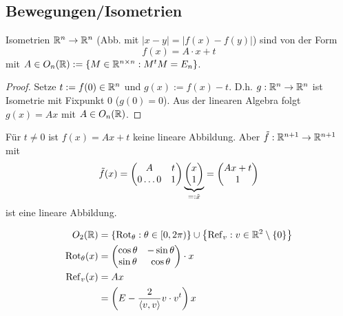 \begin{center}
	
\end{center}


\subsection*{Bewegungen/Isometrien} %
\label{sub:Bewegungen/Isometrien}

\begin{thm}
	Isometrien $\mathbb R^n \to \mathbb R^n$ (Abb. mit $|x-y| = |f(x)-f(y)|$) sind von der Form
	$$
		f(x) = A \cdot x + t
	$$
	mit $A \in O_n(\mathbb R) := \left\{ M \in \mathbb R^{n \times n} : M^t M = E_n \right\}$.
	\begin{proof}
		Setze $t := f(0) \in \mathbb R^n$ und $g(x) := f(x) - t$. D.h. $g: \mathbb R^n \to \mathbb R^n$ ist Isometrie mit
		Fixpunkt $0$ ($g(0) = 0$). Aus der linearen Algebra folgt $g(x) = Ax$ mit $A \in O_n(\mathbb R)$.
	\end{proof}
\end{thm}

\begin{bem}
	Für $t \neq 0$ ist $f(x) = Ax + t$ keine lineare Abbildung. Aber $\tilde{f}: \mathbb R^{n+1} \to
	\mathbb R^{n+1}$ mit
	$$
		\tilde{f}(x) =
		\begin{pmatrix}
			A & t\\
			0 \dots 0 & 1
		\end{pmatrix}
		\underbrace{\begin{pmatrix}{x}\\{1}\end{pmatrix}}_{=:\tilde{x}}
		=
		\begin{pmatrix}{Ax+t}\\{1}\end{pmatrix}
	$$
	ist eine lineare Abbildung.
\end{bem}

\begin{bem}
	\begin{align*}
		O_2(\mathbb R) & = \left\{ \operatorname{Rot}_\theta : \theta \in [0,2\pi) \right\} \cup
			\left\{ \operatorname{Ref}_v : v \in \mathbb R^2 \setminus \left\{ 0 \right\} \right\}\\
		\operatorname{Rot}_\theta (x) & =
		\begin{pmatrix}
			\cos \theta & - \sin \theta\\
			\sin \theta & \cos \theta
		\end{pmatrix}
		\cdot x\\
		\operatorname{Ref}_v (x) & = Ax\\
		& = \left( E - \frac{2}{\left\langle v, v \right\rangle} v \cdot v^t \right) x
	\end{align*}
\end{bem}


